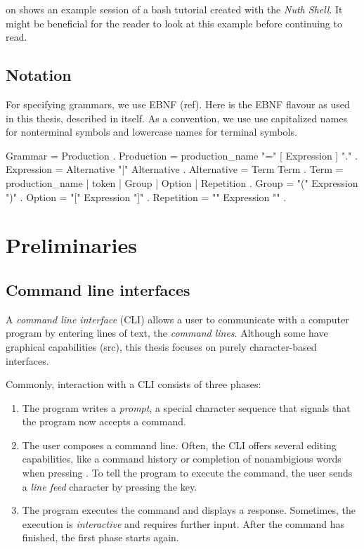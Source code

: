 \documentclass[paper=a4,twoside,abstract=on,cleardoublepage=empty,numbers=noenddot,toc=bib,11pt,appendixprefix=true]{scrreprt}
\begin{document}
 on  shows an example session of a bash tutorial created with the \emph{Nuth Shell}. It might be beneficial for the reader to look at this example before continuing to read.

\section{Notation}
\label{sec:ebnf}

For specifying grammars, we use EBNF (ref). Here is the EBNF flavour as used in this thesis, described in itself.
As a convention, we use use capitalized names for nonterminal symbols and lowercase names for terminal symbols.

\begin{ebnf}
Grammar     = { Production } .
Production  = production_name "=" [ Expression ] "." .
Expression  = Alternative { "|" Alternative } .
Alternative = Term { Term } .
Term        = production_name | token | Group | Option | Repetition .
Group       = "(" Expression ")" .
Option      = "[" Expression "]" .
Repetition  = "{" Expression "}" .
\end{ebnf}

\chapter{Preliminaries}
\label{sec:preliminaries}

\section{Command line interfaces}
\label{sec:cli}

A \emph{command line interface} (\textsc{CLI}) allows a user to communicate with a computer program by entering lines of text, the \emph{command lines}. Although some have graphical capabilities (src), this thesis focuses on purely character-based interfaces.

Commonly, interaction with a \textsc{CLI} consists of three phases:

\begin{enumerate}
    \item The program writes a \emph{prompt}, a special character sequence that signals that the program now accepts a command.
    \item The user composes a command line. Often, the CLI offers several editing capabilities, like a command history or completion of nonambigious words when pressing . To tell the program to execute the command, the user sends a \emph{line feed} character by pressing the  key.
    \item The program executes the command and displays a response. Sometimes, the execution is \emph{interactive} and requires further input. After the command has finished, the first phase starts again.
\end{enumerate}
\end{document}
